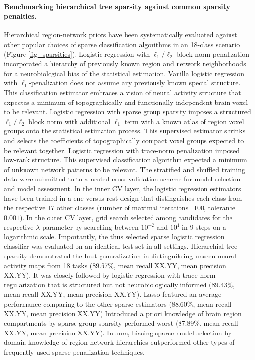 \documentclass{article} %
\begin{document}
\paragraph{Benchmarking hierarchical tree sparsity against
common sparsity penalties.}
Hierarchical region-network priors have been systematically
evaluated against other popular choices of sparse classification algorithms
in an 18-class scenario
(Figure \ref{fig_sparsities}).
%
Logistic regression with $\ell_1/\ell_2$ block norm penalization
incorporated a hierarchy of previously known region and network neighborhoods
for a neurobiological bias of the statistical estimation.
%
Vanilla logistic regression with $\ell_1$-penalization
does not assume any previously known special structure.
This classification estimator embraces a vision of neural activity structure
that expectes a minimum of
topographically and functionally independent brain voxel to be relevant.
%
Logistic regression with sparse group sparsity
imposes a structured $\ell_1/\ell_2$ block norm with additional $\ell_1$ term
with a known atlas of region voxel groups onto the statistical estimation process.
This supervised estimator shrinks and selects the coefficients
of topographically compact voxel groups expected to be relevant together.
%
Logistic regression with trace-norm penalization
imposed low-rank structure.
This supervised classification algorithm
expected a minimum of unknown network patterns
to be relevant.
%
The stratified and shuffled training data were submitted to
to a nested cross-validation scheme
for model selection and model assessment.
In the inner CV layer, the logistic regression estimators
have been trained in a one-versus-rest design that
distinguishes each class from
the respective 17 other classes
(number of maximal iterations=$100$, tolerance=$0.001$).
In the outer CV layer, grid search
selected among candidates for the respective $\lambda$ parameter
by searching between $10^{-2}$ and $10^{1}$ in 9 steps on a logarithmic scale.
Importantly, the thus selected sparse logistic regression classifier was
evaluated on an identical test set in all settings.
%
Hierarchial tree sparsity demonstrated the best generalization
in distinguihsing unseen neural activity maps from 18 tasks
(89.67\%, mean recall XX.YY, mean precision XX.YY).
It was closely followed by logistic regression with trace-norm
regularization that is structured but not neurobiologically informed
(89.43\%, mean recall XX.YY, mean precision XX.YY).
Lasso featured an average performance comparing to the other sparse estimators
(88.60\%, mean recall XX.YY, mean precision XX.YY)
Introduced a priori knowledge of brain region compartments
by sparse group sparsity performed worst
(87.89\%, mean recall XX.YY, mean precision XX.YY).
%
In sum,
biasing sparse model selection by domain knowledge of region-network hierarchies
outperformed other types of frequently used sparse penalization techniques.
\end{document}
